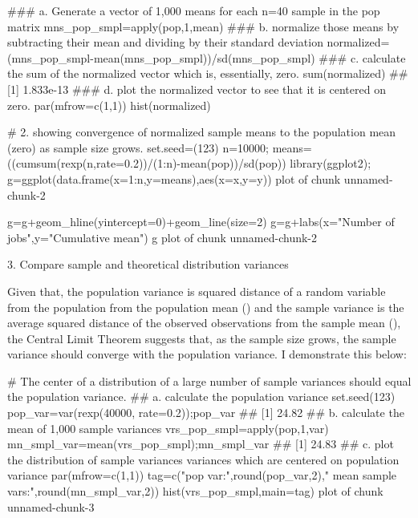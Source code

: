 \documentclass[11pt, oneside]{article}   	%
\begin{document}
### a. Generate a vector of 1,000 means for each n=40 sample in the pop matrix
mns_pop_smpl=apply(pop,1,mean)
### b. normalize those means by subtracting their mean and dividing by their standard deviation
normalized=(mns_pop_smpl-mean(mns_pop_smpl))/sd(mns_pop_smpl)
### c. calculate the sum of the normalized vector which is, essentially, zero.  
sum(normalized)
## [1] 1.833e-13
### d. plot the normalized vector to see that it is centered on zero. 
par(mfrow=c(1,1))
hist(normalized)

# 2. showing convergence of normalized sample means to the population mean (zero) as sample size grows.
set.seed=(123)
n=10000; 
means=((cumsum(rexp(n,rate=0.2))/(1:n)-mean(pop))/sd(pop))
library(ggplot2); g=ggplot(data.frame(x=1:n,y=means),aes(x=x,y=y))
plot of chunk unnamed-chunk-2

g=g+geom_hline(yintercept=0)+geom_line(size=2)
g=g+labs(x="Number of jobs",y="Cumulative mean")
g
plot of chunk unnamed-chunk-2

3. Compare sample and theoretical distribution variances

Given that, the population variance is squared distance of a random variable from the population from the population mean () and the sample variance is the average squared distance of the observed observations from the sample mean (), the Central Limit Theorem suggests that, as the sample size grows, the sample variance should converge with the population variance. I demonstrate this below:

# The center of a distribution of a large number of sample variances should equal the population variance.
## a. calculate the population variance
set.seed(123)
pop_var=var(rexp(40000, rate=0.2));pop_var
## [1] 24.82
## b. calculate the mean of 1,000 sample variances
vrs_pop_smpl=apply(pop,1,var)
mn_smpl_var=mean(vrs_pop_smpl);mn_smpl_var
## [1] 24.83
## c. plot the distribution of sample variances variances which are centered on population variance
par(mfrow=c(1,1))
tag=c("pop var:",round(pop_var,2)," mean sample vars:",round(mn_smpl_var,2))
hist(vrs_pop_smpl,main=tag)
plot of chunk unnamed-chunk-3
\end{document}

